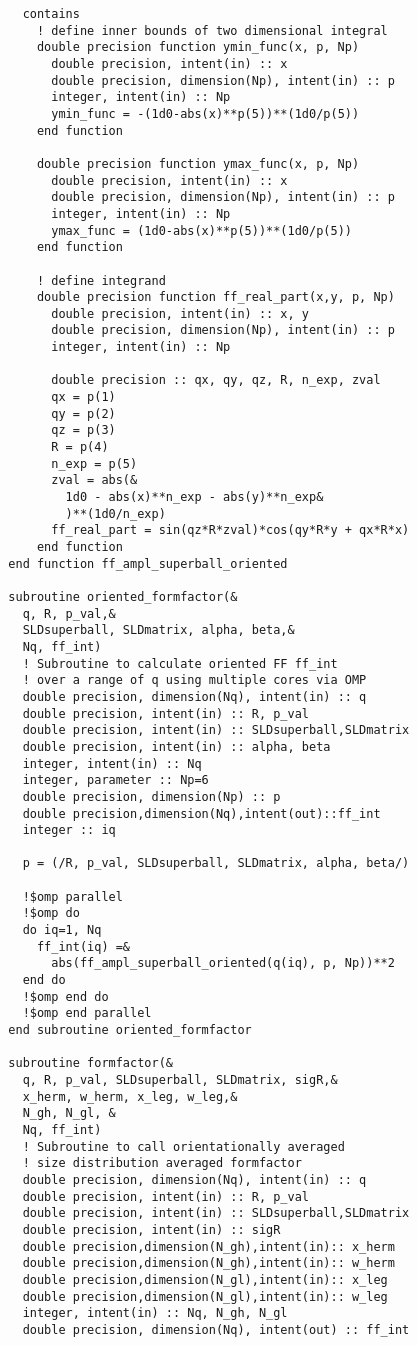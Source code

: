 \documentclass[\main/dresen_thesis.tex]{subfiles}
\begin{document}
\begin{lstlisting}
    contains
      ! define inner bounds of two dimensional integral
      double precision function ymin_func(x, p, Np)
        double precision, intent(in) :: x
        double precision, dimension(Np), intent(in) :: p
        integer, intent(in) :: Np
        ymin_func = -(1d0-abs(x)**p(5))**(1d0/p(5))
      end function

      double precision function ymax_func(x, p, Np)
        double precision, intent(in) :: x
        double precision, dimension(Np), intent(in) :: p
        integer, intent(in) :: Np
        ymax_func = (1d0-abs(x)**p(5))**(1d0/p(5))
      end function

      ! define integrand
      double precision function ff_real_part(x,y, p, Np)
        double precision, intent(in) :: x, y
        double precision, dimension(Np), intent(in) :: p
        integer, intent(in) :: Np

        double precision :: qx, qy, qz, R, n_exp, zval
        qx = p(1)
        qy = p(2)
        qz = p(3)
        R = p(4)
        n_exp = p(5)
        zval = abs(&
          1d0 - abs(x)**n_exp - abs(y)**n_exp&
          )**(1d0/n_exp)
        ff_real_part = sin(qz*R*zval)*cos(qy*R*y + qx*R*x)
      end function
  end function ff_ampl_superball_oriented

  subroutine oriented_formfactor(&
    q, R, p_val,&
    SLDsuperball, SLDmatrix, alpha, beta,&
    Nq, ff_int)
    ! Subroutine to calculate oriented FF ff_int
    ! over a range of q using multiple cores via OMP
    double precision, dimension(Nq), intent(in) :: q
    double precision, intent(in) :: R, p_val
    double precision, intent(in) :: SLDsuperball,SLDmatrix
    double precision, intent(in) :: alpha, beta
    integer, intent(in) :: Nq
    integer, parameter :: Np=6
    double precision, dimension(Np) :: p
    double precision,dimension(Nq),intent(out)::ff_int
    integer :: iq

    p = (/R, p_val, SLDsuperball, SLDmatrix, alpha, beta/)

    !$omp parallel
    !$omp do
    do iq=1, Nq
      ff_int(iq) =&
        abs(ff_ampl_superball_oriented(q(iq), p, Np))**2
    end do
    !$omp end do
    !$omp end parallel
  end subroutine oriented_formfactor

  subroutine formfactor(&
    q, R, p_val, SLDsuperball, SLDmatrix, sigR,&
    x_herm, w_herm, x_leg, w_leg,&
    N_gh, N_gl, &
    Nq, ff_int)
    ! Subroutine to call orientationally averaged
    ! size distribution averaged formfactor
    double precision, dimension(Nq), intent(in) :: q
    double precision, intent(in) :: R, p_val
    double precision, intent(in) :: SLDsuperball,SLDmatrix
    double precision, intent(in) :: sigR
    double precision,dimension(N_gh),intent(in):: x_herm
    double precision,dimension(N_gh),intent(in):: w_herm
    double precision,dimension(N_gl),intent(in):: x_leg
    double precision,dimension(N_gl),intent(in):: w_leg
    integer, intent(in) :: Nq, N_gh, N_gl
    double precision, dimension(Nq), intent(out) :: ff_int


\end{lstlisting}
\end{document}
